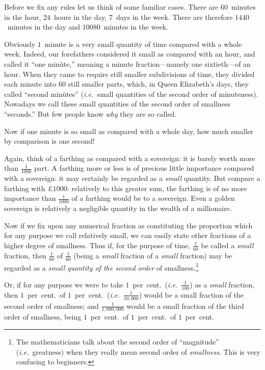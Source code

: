 \documentclass[12pt]{book}[2005/09/16]
\newcommand{\DPPageSep}[2]{\Pagelabel{#2}}
\newcommand{\Pagelabel}[1]
  {\phantomsection\label{#1}}
\newcommand{\IE}{\textit{i.e.}}
\newcommand{\DPnote}[1]{}%
\begin{document}
Before we fix any rules let us think of some
familiar cases. There are $60$~minutes in the hour,
$24$~hours in the day, $7$~days in the week. There are
therefore $1440$~minutes in the day and $10080$~minutes
in the week.

Obviously $1$~minute is a very small quantity of
time compared with a whole week. Indeed, our
forefathers considered it small as compared with an
hour, and called it ``one minùte,'' meaning a minute
fraction---namely one sixtieth---of an hour. When
they came to require still smaller subdivisions of time,
they divided each minute into $60$ still smaller parts,
which, in Queen Elizabeth's days, they called ``second
minùtes''\DPnote{** TN: [sic]} (\IE~small quantities of the second order of
minuteness). Nowadays we call these small quantities
\DPPageSep{016.png}{4}%
of the second order of smallness ``seconds.'' But few
people know \emph{why} they are so called.

Now if one minute is so small as compared with a
whole day, how much smaller by comparison is one
second!

Again, think of a farthing as compared with a
sovereign: it is barely worth more than $\frac{1}{1000}$ part.
A farthing more or less is of precious little importance
compared with a sovereign: it may certainly be regarded
as a \emph{small} quantity. But compare a farthing
with £$1000$: relatively to this greater sum, the
farthing is of no more importance than $\frac{1}{1000}$ of a
farthing would be to a sovereign. Even a golden
sovereign is relatively a negligible quantity in the
wealth of a millionaire.

Now if we fix upon any numerical fraction as
constituting the proportion which for any purpose
we call relatively small, we can easily state other
fractions of a higher degree of smallness. Thus if,
for the purpose of time, $\frac{1}{60}$ be called a \emph{small} fraction,
then $\frac{1}{60}$ of $\frac{1}{60}$ (being a \emph{small} fraction of a \emph{small}
fraction) may be regarded as a \emph{small quantity of the
second order}\Pagelabel{smallness} of smallness.\footnote
  {The mathematicians talk about the second order of ``magnitude''
  (\IE~greatness) when they really mean second order of \emph{smallness}.
  This is very confusing to beginners.}

Or, if for any purpose we were to take $1$~per~cent.\
(\IE~$\frac{1}{100}$) as a \emph{small} fraction, then $1$~per~cent.\ of
$1$~per~cent.\ (\IE~$\frac{1}{10,000}$) would be a small fraction
of the second order of smallness; and $\frac{1}{1,000,000}$ would
\DPPageSep{017.png}{5}%
be a small fraction of the third order of smallness,
being $1$~per~cent.\ of $1$~per~cent.\ of $1$~per~cent.
\end{document}
